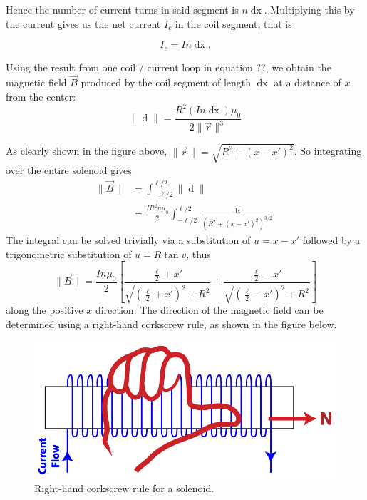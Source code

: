 Hence the number of current turns in said segment is $n \mathop{\mathrm{d}x}$. Multiplying this by the current gives us the net current $I_c$ in the coil segment, that is

\begin{equation}
    I_c = In\mathop{\mathrm{d}x}.
\end{equation}

Using the result from one coil / current loop in equation ??, we obtain the magnetic field $\vec{B}$ produced by the coil segment of length $\mathop{\mathrm{d}x}$ at a distance of $x$ from the center:
\begin{equation}
    \| \mathop{\mathrm{d}\vec{B}} \| = \frac{R^2 (In\mathop{\mathrm{d}x}) \mu_0}{2 \| \vec{r} \|^3}
\end{equation}

As clearly shown in the figure above, $\| \vec{r} \| = \sqrt{R^2 + (x - x')^2}$. So integrating over the entire solenoid gives
\begin{align}
    \| \vec{B} \| &= \int_{-\ell/2}^{\ell/2} \| \mathop{\mathrm{d}\vec{B}} \| \\
    &= \frac{IR^2n\mu_0}{2} \int_{-\ell/2}^{\ell/2} \frac{\mathop{\mathrm{d}x}}{\left(R^2 + (x - x')^2\right)^{3/2}}
\end{align}
The integral can be solved trivially via a substitution of $u = x - x'$ followed by a trigonometric substitution of $u = R\tan v$, thus
\begin{equation}
    \| \vec{B} \| = \frac{I n \mu_0}{2} \left[\frac{\frac{\ell}{2} + x'}{\sqrt{\left(\frac{\ell}{2} + x'\right)^2 + R^2}} + \frac{\frac{\ell}{2} - x'}{\sqrt{\left(\frac{\ell}{2} - x'\right)^2 + R^2}}\right]
\end{equation}
along the positive $x$ direction. The direction of the magnetic field can be determined using a right-hand corkscrew rule, as shown in the figure below. 

\begin{figure}[h!]
    \centering
    \includegraphics[scale=0.3]{notes/images/Solenoid-RHR.JPG}
    \caption{Right-hand corkscrew rule for a solenoid.}
\end{figure}
\FloatBarrier


